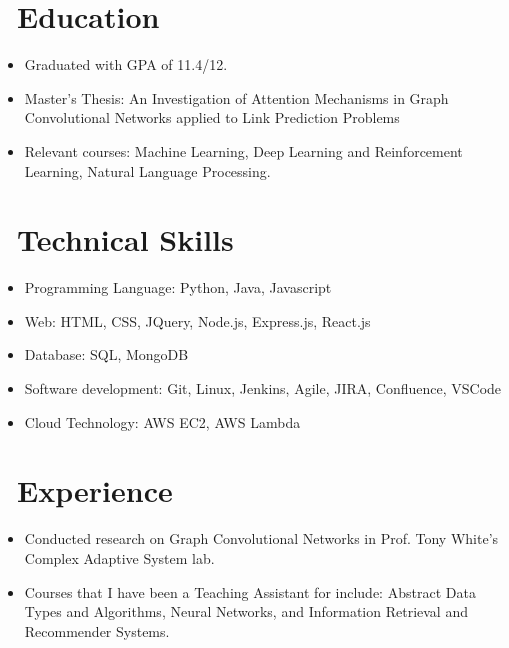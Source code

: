 \documentclass{resume}
\begin{document}



\section{\faGraduationCap\ Education}
\begin{itemize}
	\item Graduated with GPA of 11.4/12.
	\item Master's Thesis: An Investigation of Attention Mechanisms in Graph Convolutional Networks applied to Link Prediction Problems
	\item Relevant courses: Machine Learning, Deep Learning and Reinforcement Learning, Natural Language Processing.
\end{itemize}
 


\section{\faCogs\ Technical Skills}
\begin{itemize}
	\item Programming Language: Python, Java, Javascript
	\item Web: HTML, CSS, JQuery, Node.js, Express.js, React.js
	\item Database: SQL, MongoDB
	\item Software development: Git, Linux, Jenkins, Agile, JIRA, Confluence, VSCode
	\item Cloud Technology: AWS EC2, AWS Lambda
\end{itemize}

\section{\faCogs\ Experience}
{}
\begin{itemize}
	\item Conducted research on Graph Convolutional Networks in Prof. Tony White's Complex Adaptive System lab.
	\item Courses that I have been a Teaching Assistant for include: Abstract Data Types and Algorithms, Neural Networks, and Information Retrieval and Recommender Systems.
\end{itemize}
\end{document}
